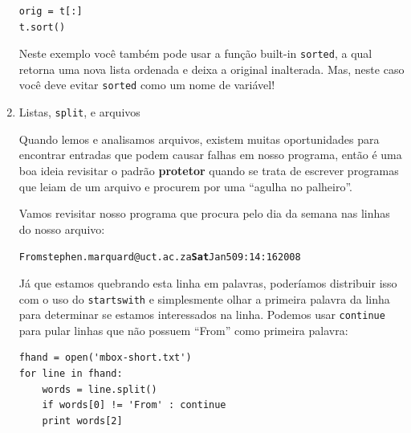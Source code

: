 \begin{enumerate}
\beforeverb
\begin{verbatim}
orig = t[:]
t.sort()
\end{verbatim}
\afterverb

Neste exemplo você também pode usar a função built-in {\tt sorted},
a qual retorna uma nova lista ordenada e deixa a original inalterada.
Mas, neste caso você deve evitar {\tt sorted} como um nome de variável!

\item Listas, {\tt split}, e arquivos

Quando lemos e analisamos arquivos, existem muitas oportunidades
para encontrar entradas que podem causar falhas em nosso programa,
então é uma boa ideia revisitar o padrão {\bf protetor} quando
se trata de escrever programas que leiam de um arquivo e procurem
por uma ``agulha no palheiro''.

Vamos revisitar nosso programa que procura pelo dia da semana
nas linhas do nosso arquivo:

\beforeverb
\begin{alltt}
From stephen.marquard@uct.ac.za {\bf Sat} Jan  5 09:14:16 2008
\end{alltt}
\afterverb

Já que estamos quebrando esta linha em palavras, poderíamos distribuir
isso com o uso do {\tt startswith} e simplesmente olhar a primeira palavra
da linha para determinar se estamos interessados na linha. Podemos usar {\tt continue} 
para pular linhas que não possuem ``From'' como primeira palavra:

\beforeverb
\begin{verbatim}
fhand = open('mbox-short.txt')
for line in fhand:
    words = line.split()
    if words[0] != 'From' : continue
    print words[2]
\end{verbatim}
\afterverb
%


\end{enumerate}
